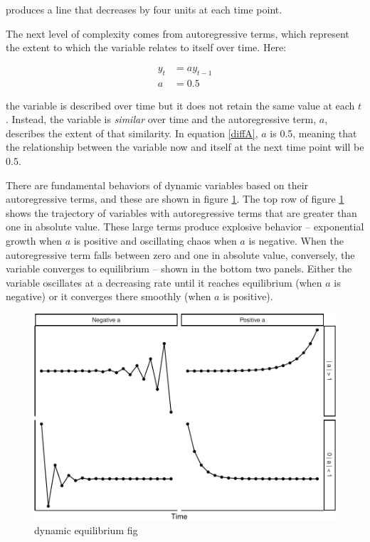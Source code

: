 \documentclass[english,,man]{apa6}
\theoremstyle{definition}
\theoremstyle{definition}
\theoremstyle{definition}
\theoremstyle{remark}
\begin{document}
\noindent produces a line that decreases by four units at each time
point.

The next level of complexity comes from autoregressive terms, which
represent the extent to which the variable relates to itself over time.
Here:

\begin{equation}
\begin{split}
\label{diffA}
y_{t} &= a y_{t-1} \\ 
a &= 0.5
\end{split}
\end{equation}

\noindent the variable is described over time but it does not retain the
same value at each \(t\). Instead, the variable is \emph{similar} over
time and the autoregressive term, \(a\), describes the extent of that
similarity. In equation \ref{diffA}, \(a\) is 0.5, meaning that the
relationship between the variable now and itself at the next time point
will be 0.5.

There are fundamental behaviors of dynamic variables based on their
autoregressive terms, and these are shown in figure \ref{dynamics_plot}.
The top row of figure \ref{dynamics_plot} shows the trajectory of
variables with autoregressive terms that are greater than one in
absolute value. These large terms produce explosive behavior --
exponential growth when \(a\) is positive and oscillating chaos when
\(a\) is negative. When the autoregressive term falls between zero and
one in absolute value, conversely, the variable converges to equilibrium
-- shown in the bottom two panels. Either the variable oscillates at a
decreasing rate until it reaches equilibrium (when \(a\) is negative) or
it converges there smoothly (when \(a\) is positive).

\begin{figure}
\centering
\includegraphics{figs/unnamed-chunk-7-1.pdf}
\caption{\label{fig:unnamed-chunk-7}dynamic equilibrium
fig\label{dynamics_plot}}
\end{figure}
\end{document}
